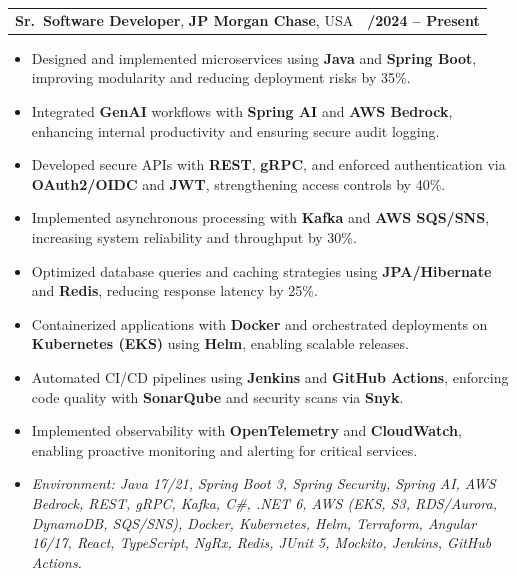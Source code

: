 \documentclass[letterpaper,11pt]{article}
\makeatletter
\newcommand{\resumeItem}[1]{
  \item\footnotesize{
    {#1 \vspace{-2pt}}
  }
}
\newcommand{\resumeSubheading}[4]{
  \vspace{-2pt}\item
    \begin{tabular*}{1.0\textwidth}[t]{l@{\extracolsep{\fill}}r}
      \textbf{\fontsize{10pt}{14pt}\selectfont #3}, \textbf{\fontsize{10pt}{14pt}\selectfont #1}, \fontsize{10pt}{14pt}\selectfont #4 & \textbf{\fontsize{10pt}{14pt}\selectfont #2} \\
    \end{tabular*}\vspace{-7pt}
}
\newcommand{\resumeItemListStart}{\begin{itemize}[leftmargin=*]}
\newcommand{\resumeItemListEnd}{\end{itemize}\vspace{-5pt}}
\makeatother
\begin{document}
\resumeSubheading
{JP Morgan Chase}{09/2024 -- Present}
{Sr.\ Software Developer}{USA}
\resumeItemListStart
  \resumeItem{Designed and implemented microservices using \textbf{Java} and \textbf{Spring Boot}, improving modularity and reducing deployment risks by 35\%.}
  \resumeItem{Integrated \textbf{GenAI} workflows with \textbf{Spring AI} and \textbf{AWS Bedrock}, enhancing internal productivity and ensuring secure audit logging.}
  \resumeItem{Developed secure APIs with \textbf{REST}, \textbf{gRPC}, and enforced authentication via \textbf{OAuth2/OIDC} and \textbf{JWT}, strengthening access controls by 40\%.}
  \resumeItem{Implemented asynchronous processing with \textbf{Kafka} and \textbf{AWS SQS/SNS}, increasing system reliability and throughput by 30\%.}
  \resumeItem{Optimized database queries and caching strategies using \textbf{JPA/Hibernate} and \textbf{Redis}, reducing response latency by 25\%.}
  \resumeItem{Containerized applications with \textbf{Docker} and orchestrated deployments on \textbf{Kubernetes (EKS)} using \textbf{Helm}, enabling scalable releases.}
  \resumeItem{Automated CI/CD pipelines using \textbf{Jenkins} and \textbf{GitHub Actions}, enforcing code quality with \textbf{SonarQube} and security scans via \textbf{Snyk}.}
  \resumeItem{Implemented observability with \textbf{OpenTelemetry} and \textbf{CloudWatch}, enabling proactive monitoring and alerting for critical services.}
  \resumeItem{\textit{Environment: Java 17/21, Spring Boot 3, Spring Security, Spring AI, AWS Bedrock, REST, gRPC, Kafka, C\#, .NET 6, AWS (EKS, S3, RDS/Aurora, DynamoDB, SQS/SNS), Docker, Kubernetes, Helm, Terraform, Angular 16/17, React, TypeScript, NgRx, Redis, JUnit 5, Mockito, Jenkins, GitHub Actions.}}
\resumeItemListEnd
\end{document}
